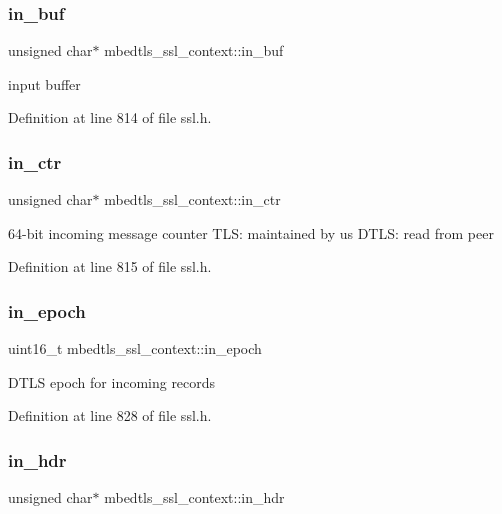 \subsubsection{\texorpdfstring{in\+\_\+buf}{in\_buf}}
{\footnotesize\ttfamily unsigned char$\ast$ mbedtls\+\_\+ssl\+\_\+context\+::in\+\_\+buf}

input buffer 

Definition at line 814 of file ssl.\+h.

\mbox{\label{structmbedtls__ssl__context_ab53517e77417e69419985902a528cc6a}} 
\subsubsection{\texorpdfstring{in\+\_\+ctr}{in\_ctr}}
{\footnotesize\ttfamily unsigned char$\ast$ mbedtls\+\_\+ssl\+\_\+context\+::in\+\_\+ctr}

64-\/bit incoming message counter T\+LS\+: maintained by us D\+T\+LS\+: read from peer 

Definition at line 815 of file ssl.\+h.

\mbox{\label{structmbedtls__ssl__context_ae6d4405b5829fb244a0d6a4ad1e20d91}} 
\subsubsection{\texorpdfstring{in\+\_\+epoch}{in\_epoch}}
{\footnotesize\ttfamily uint16\+\_\+t mbedtls\+\_\+ssl\+\_\+context\+::in\+\_\+epoch}

D\+T\+LS epoch for incoming records 

Definition at line 828 of file ssl.\+h.

\mbox{\label{structmbedtls__ssl__context_ac1d0542cf430db2fb4b2855afc29fd5e}} 
\subsubsection{\texorpdfstring{in\+\_\+hdr}{in\_hdr}}
{\footnotesize\ttfamily unsigned char$\ast$ mbedtls\+\_\+ssl\+\_\+context\+::in\+\_\+hdr}

